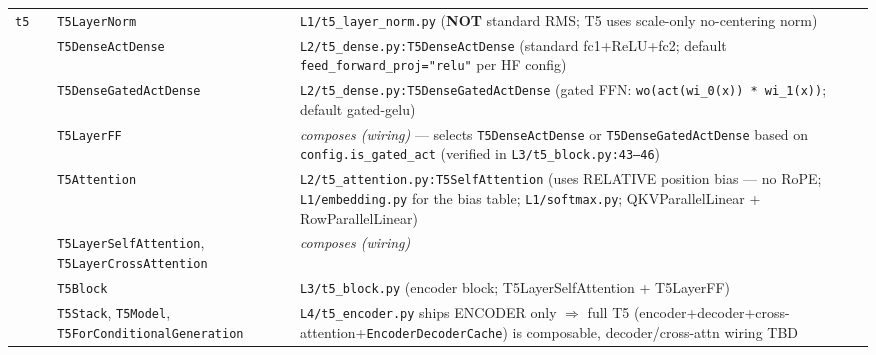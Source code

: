 \documentclass[10pt]{article}
\newcommand{\cmark}{\ding{51}}
\begin{document}
{\begin{longtable}{@{}p{1.6cm} c p{4.0cm} p{14.5cm}@{}}
\multirow{8}{*}{\texttt{t5}} & \multirow{8}{*}{\cmark}
   & \texttt{T5LayerNorm}             & \texttt{L1/t5\_layer\_norm.py} (\textbf{NOT} standard RMS; T5 uses scale-only no-centering norm) \\
&& \texttt{T5DenseActDense}           & \texttt{L2/t5\_dense.py:T5DenseActDense} (standard fc1+ReLU+fc2; default \texttt{feed\_forward\_proj="relu"} per HF config) \\
&& \texttt{T5DenseGatedActDense}      & \texttt{L2/t5\_dense.py:T5DenseGatedActDense} (gated FFN: \texttt{wo(act(wi\_0(x)) * wi\_1(x))}; default gated-gelu) \\
&& \texttt{T5LayerFF}                 & \textit{composes (wiring)} --- selects \texttt{T5DenseActDense} or \texttt{T5DenseGatedActDense} based on \texttt{config.is\_gated\_act} (verified in \texttt{L3/t5\_block.py:43--46}) \\
&& \texttt{T5Attention}               & \texttt{L2/t5\_attention.py:T5SelfAttention} (uses RELATIVE position bias --- no RoPE; \texttt{L1/embedding.py} for the bias table; \texttt{L1/softmax.py}; QKVParallelLinear + RowParallelLinear) \\
&& \texttt{T5LayerSelfAttention}, \texttt{T5LayerCrossAttention} & \textit{composes (wiring)} \\
&& \texttt{T5Block}                   & \texttt{L3/t5\_block.py} (encoder block; T5LayerSelfAttention + T5LayerFF) \\
&& \texttt{T5Stack}, \texttt{T5Model}, \texttt{T5ForConditionalGeneration} & \texttt{L4/t5\_encoder.py} ships ENCODER only $\Rightarrow$ full T5 (encoder+decoder+cross-attention+\texttt{EncoderDecoderCache}) is composable, decoder/cross-attn wiring TBD \\
\midrule


\end{longtable}}
\end{document}
